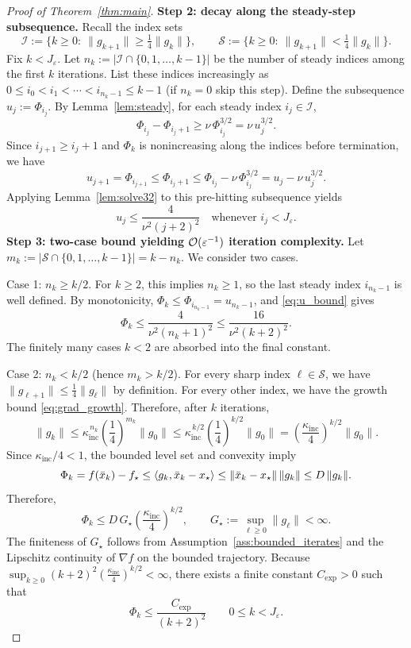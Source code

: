 \documentclass[review,onefignum,onetabnum]{siamart171218}
\begin{document}
\begin{proof}[Proof of Theorem~\ref{thm:main}]
		\smallskip
		\noindent\textbf{Step 2: decay along the steady-step subsequence.}
		Recall the index sets
		\[
		\mathcal I:=\{k\ge 0:\ \|g_{k+1}\|\ge \tfrac14\|g_k\|\},
		\qquad
		\mathcal S:=\{k\ge 0:\ \|g_{k+1}\|< \tfrac14\|g_k\|\}.
		\]
		Fix $k<J_\varepsilon$.
		Let $n_k:=|\mathcal I\cap\{0,1,\dots,k-1\}|$ be the number of steady indices among the first $k$ iterations.
		List these indices increasingly as $0\le i_0<i_1<\cdots<i_{n_k-1}\le k-1$ (if $n_k=0$ skip this step).
		Define the subsequence $u_j:=\Phi_{i_j}$.
		By Lemma~\ref{lem:steady}, for each steady index $i_j\in\mathcal I$,
		\[
		\Phi_{i_j}-\Phi_{i_j+1}\ge \nu\,\Phi_{i_j}^{3/2}=\nu\,u_j^{3/2}.
		\]
		Since \(i_{j+1}\ge i_j+1\) and \(\Phi_k\) is nonincreasing
		along the indices before termination, we have
		\[
		u_{j+1}
		=\Phi_{i_{j+1}}
		\le \Phi_{i_j+1}
		\le \Phi_{i_j}-\nu\,\Phi_{i_j}^{3/2}
		= u_j-\nu\,u_j^{3/2}.
		\]
		Applying Lemma~\ref{lem:solve32} to this pre-hitting subsequence yields
		\begin{equation}\label{eq:u_bound}
			u_j\le \frac{4}{\nu^2(j+2)^2}
			\quad\text{whenever } i_j< J_\varepsilon.
		\end{equation}
		\smallskip
		\noindent\textbf{Step 3: two-case bound yielding $\mathcal{O}(\varepsilon^{-1})$ iteration complexity.}
		Let $m_k:=|\mathcal S\cap\{0,1,\dots,k-1\}|=k-n_k$.
		We consider two cases.
		
		Case 1: $n_k\ge k/2$.
		For $k\ge2$, this implies $n_k\ge1$, so the last steady index
		$i_{n_k-1}$ is well defined. By monotonicity,
		$\Phi_k\le \Phi_{i_{n_k-1}}=u_{n_k-1}$, and \eqref{eq:u_bound} gives
		\[
		\Phi_k\le \frac{4}{\nu^2(n_k+1)^2}\le \frac{16}{\nu^2(k+2)^2}.
		\]
		The finitely many cases $k<2$ are absorbed into the final constant.
		
		Case 2: $n_k< k/2$ (hence $m_k>k/2$).
		For every sharp index $\ell\in\mathcal S$, we have $\|g_{\ell+1}\|\le \frac14\|g_\ell\|$ by definition.
		For every other index, we have the growth bound \eqref{eq:grad_growth}.
		Therefore, after $k$ iterations,
		\[
		\|g_k\|
		\le \kappa_{\mathrm{inc}}^{\,n_k}\left(\frac14\right)^{m_k}\|g_0\|
		\le \kappa_{\mathrm{inc}}^{\,k/2}\left(\frac14\right)^{k/2}\|g_0\|
		=\left(\frac{\kappa_{\mathrm{inc}}}{4}\right)^{k/2}\|g_0\|.
		\]
		Since $\kappa_{\mathrm{inc}}/4<1$, the bounded level set and convexity imply
		\[
		\Phi_k=f(\bar x_k)-f_\star
		\le \left\langle g_k,\bar x_k-x_\star\right\rangle
		\le \|\bar x_k-x_\star\|\,\|g_k\|
		\le D\,\|g_k\|.
		\]
		Therefore,
		\[
		\Phi_k\le D\,G_\star\left(\frac{\kappa_{\mathrm{inc}}}{4}\right)^{k/2},
		\qquad
		G_\star:=\sup_{\ell\ge0}\|g_\ell\|<\infty.
		\]
		The finiteness of $G_\star$ follows from
		Assumption~\ref{ass:bounded_iterates} and the Lipschitz continuity
		of $\nabla f$ on the bounded trajectory.
		Because $\sup_{k\ge 0}(k+2)^2\left(\frac{\kappa_{\mathrm{inc}}}{4}\right)^{k/2}<\infty$, there exists a finite constant $C_{\exp}>0$ such that
		\[
		\Phi_k\le \frac{C_{\exp}}{(k+2)^2}\qquad 0\le k<J_\varepsilon.
		\]
		

\end{proof}
\end{document}
